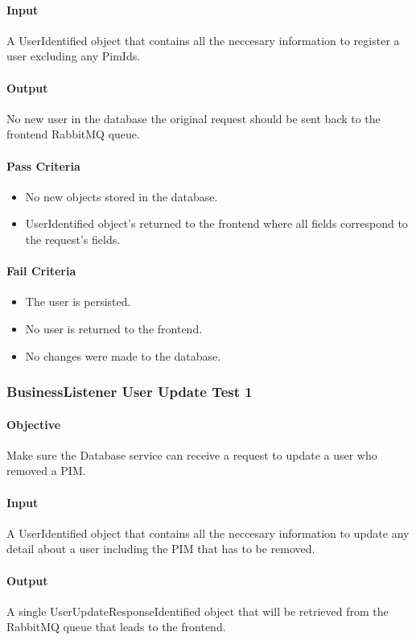 \documentclass[hidelinks,english]{article}
\begin{document}
				\paragraph{Input} A UserIdentified object that contains all the neccesary information to register a user excluding any PimIds.
				\paragraph{Output} No new user in the database the original request should be sent back to the frontend RabbitMQ queue.
				\paragraph{Pass Criteria}
				\begin{itemize}
					\item No new objects stored in the database.
					\item UserIdentified object's returned to the frontend where all fields correspond to the request's fields.
				\end{itemize}
				\paragraph{Fail Criteria}
				\begin{itemize}
					\item The user is persisted.
					\item No user is returned to the frontend.
					\item No changes were made to the database.
				\end{itemize}
				
				\subsubsection{BusinessListener User Update Test 1}\label{databasebusinesslistenerupdatetest1}
				\paragraph{Objective} Make sure the Database service can receive a request to update a user who removed a PIM.
				\paragraph{Input} A UserIdentified object that contains all the neccesary information to update any detail about a user including the PIM that has to be removed.
				\paragraph{Output} A single UserUpdateResponseIdentified object that will be retrieved from the RabbitMQ queue that leads to the frontend.
\end{document}
